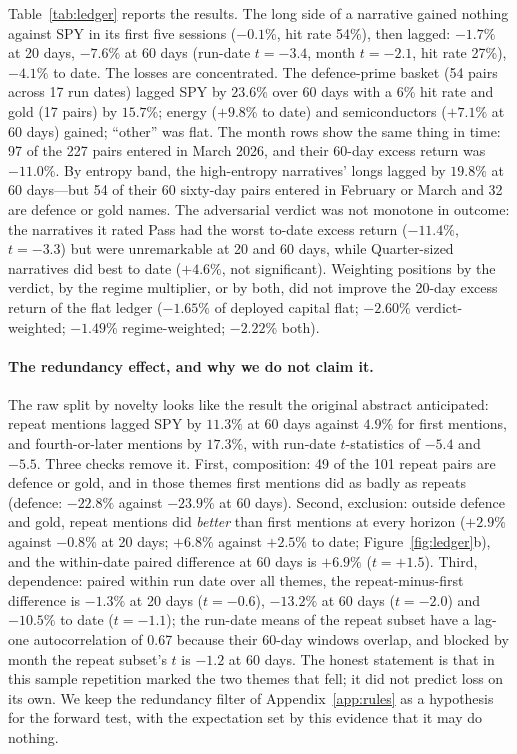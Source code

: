 \documentclass[11pt]{article}
\begin{document}
Table~\ref{tab:ledger} reports the results. The long side of a narrative gained nothing against SPY in its first five sessions ($-0.1\%$, hit rate 54\%), then lagged: $-1.7\%$ at 20 days, $-7.6\%$ at 60 days (run-date $t=-3.4$, month $t=-2.1$, hit rate 27\%), $-4.1\%$ to date. The losses are concentrated. The defence-prime basket (54 pairs across 17 run dates) lagged SPY by $23.6\%$ over 60 days with a 6\% hit rate and gold (17 pairs) by $15.7\%$; energy ($+9.8\%$ to date) and semiconductors ($+7.1\%$ at 60 days) gained; ``other'' was flat. The month rows show the same thing in time: 97 of the 227 pairs entered in March 2026, and their 60-day excess return was $-11.0\%$. By entropy band, the high-entropy narratives' longs lagged by $19.8\%$ at 60 days---but 54 of their 60 sixty-day pairs entered in February or March and 32 are defence or gold names. The adversarial verdict was not monotone in outcome: the narratives it rated Pass had the worst to-date excess return ($-11.4\%$, $t=-3.3$) but were unremarkable at 20 and 60 days, while Quarter-sized narratives did best to date ($+4.6\%$, not significant). Weighting positions by the verdict, by the regime multiplier, or by both, did not improve the 20-day excess return of the flat ledger ($-1.65\%$ of deployed capital flat; $-2.60\%$ verdict-weighted; $-1.49\%$ regime-weighted; $-2.22\%$ both).

\paragraph{The redundancy effect, and why we do not claim it.}
The raw split by novelty looks like the result the original abstract anticipated: repeat mentions lagged SPY by $11.3\%$ at 60 days against $4.9\%$ for first mentions, and fourth-or-later mentions by $17.3\%$, with run-date $t$-statistics of $-5.4$ and $-5.5$. Three checks remove it. First, composition: 49 of the 101 repeat pairs are defence or gold, and in those themes first mentions did as badly as repeats (defence: $-22.8\%$ against $-23.9\%$ at 60 days). Second, exclusion: outside defence and gold, repeat mentions did \emph{better} than first mentions at every horizon ($+2.9\%$ against $-0.8\%$ at 20 days; $+6.8\%$ against $+2.5\%$ to date; Figure~\ref{fig:ledger}b), and the within-date paired difference at 60 days is $+6.9\%$ ($t=+1.5$). Third, dependence: paired within run date over all themes, the repeat-minus-first difference is $-1.3\%$ at 20 days ($t=-0.6$), $-13.2\%$ at 60 days ($t=-2.0$) and $-10.5\%$ to date ($t=-1.1$); the run-date means of the repeat subset have a lag-one autocorrelation of 0.67 because their 60-day windows overlap, and blocked by month the repeat subset's $t$ is $-1.2$ at 60 days. The honest statement is that in this sample repetition marked the two themes that fell; it did not predict loss on its own. We keep the redundancy filter of Appendix~\ref{app:rules} as a hypothesis for the forward test, with the expectation set by this evidence that it may do nothing.
\end{document}
